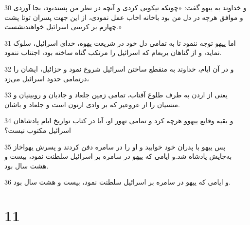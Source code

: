 \par 30 و خداوند به ییهو گفت: «چونکه نیکویی کردی و آنچه در نظر من پسندبود، بجا آوردی و موافق هر‌چه در دل من بود باخانه اخاب عمل نمودی، از این جهت پسران توتا پشت چهارم بر کرسی اسرائیل خواهندنشست.»
\par 31 اما ییهو توجه ننمود تا به تمامی دل خود در شریعت یهوه، خدای اسرائیل، سلوک نماید، و از گناهان یربعام که اسرائیل را مرتکب گناه ساخته بود، اجتناب ننمود.
\par 32 و در آن ایام، خداوند به منقطع ساختن اسرائیل شروع نمود و حزائیل، ایشان را درتمامی حدود اسرائیل می‌زد،
\par 33 یعنی از اردن به طرف طلوع آفتاب، تمامی زمین جلعاد و جادیان و روبینیان و منسیان را از عروعیر که بر وادی ارنون است و جلعاد و باشان.
\par 34 و بقیه وقایع ییهوو هر‌چه کرد و تمامی تهور او، آیا در کتاب تواریخ ایام پادشاهان اسرائیل مکتوب نیست؟
\par 35 پس ییهو با پدران خود خوابید و او را در سامره دفن کردند و پسرش یهواخاز به‌جایش پادشاه شد.و ایامی که ییهو در سامره بر اسرائیل سلطنت نمود، بیست و هشت سال بود.
\par 36 و ایامی که ییهو در سامره بر اسرائیل سلطنت نمود، بیست و هشت سال بود.
 
\chapter{11}


